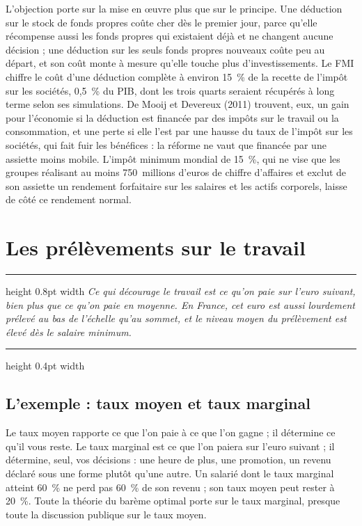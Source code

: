 \documentclass[11pt,a4paper]{article}
\newenvironment{argument}
  {\par\smallskip\noindent\begin{minipage}{\linewidth}%
   \color{encre}\hrule height 0.8pt width \linewidth \vspace{7pt}%
   \large\itshape}
  {\par\vspace{7pt}\hrule height 0.4pt width \linewidth\end{minipage}\par\medskip}
\begin{document}
L'objection porte sur la mise en œuvre plus que sur le principe. Une déduction sur le stock de fonds
propres coûte cher dès le premier jour, parce qu'elle récompense aussi les fonds propres qui
existaient déjà et ne changent aucune décision ; une déduction sur les seuls fonds propres nouveaux
coûte peu au départ, et son coût monte à mesure qu'elle touche plus d'investissements. Le FMI chiffre
le coût d'une déduction complète à environ 15~\% de la recette de l'impôt sur les sociétés, 0,5~\% du
PIB, dont les trois quarts seraient récupérés à long terme selon ses simulations. De Mooij et
Devereux (2011) trouvent, eux, un gain pour l'économie si la déduction est financée par des impôts sur
le travail ou la consommation, et une perte si elle l'est par une hausse du taux de l'impôt sur les
sociétés, qui fait fuir les bénéfices : la réforme ne vaut que financée par une assiette moins
mobile. L'impôt minimum mondial de 15~\%, qui ne vise que les groupes réalisant au moins
750~millions d'euros de chiffre d'affaires et exclut de son assiette un rendement forfaitaire sur
les salaires et les actifs corporels, laisse de côté ce rendement normal.

\section{Les prélèvements sur le travail}

\begin{argument}
Ce qui décourage le travail est ce qu'on paie sur l'euro suivant, bien plus que ce qu'on paie en
moyenne. En France, cet euro est aussi lourdement prélevé au bas de l'échelle qu'au sommet, et le
niveau moyen du prélèvement est élevé dès le salaire minimum.
\end{argument}

\subsection{L'exemple : taux moyen et taux marginal}

Le taux moyen rapporte ce que l'on paie à ce que l'on gagne ; il détermine ce qu'il vous reste. Le
taux marginal est ce que l'on paiera sur l'euro suivant ; il détermine, seul, vos décisions : une
heure de plus, une promotion, un revenu déclaré sous une forme plutôt qu'une autre. Un salarié dont
le taux marginal atteint 60~\% ne perd pas 60~\% de son revenu ; son taux moyen peut rester à
20~\%. Toute la théorie du barème optimal porte sur le taux marginal, presque toute la discussion
publique sur le taux moyen.
\end{document}
